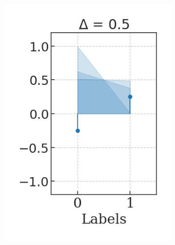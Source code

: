 \begin{figure}[H]
    \centering
    \begin{subfigure}[b]{0.2\textwidth}
        \centering
        \includegraphics[width=\textwidth]{img/results_discussion/empirical/ldiff=0.5.png}
    \end{subfigure}
    \hfill
    \begin{subfigure}[b]{0.2\textwidth}
        \centering

\end{subfigure}
\end{figure}
